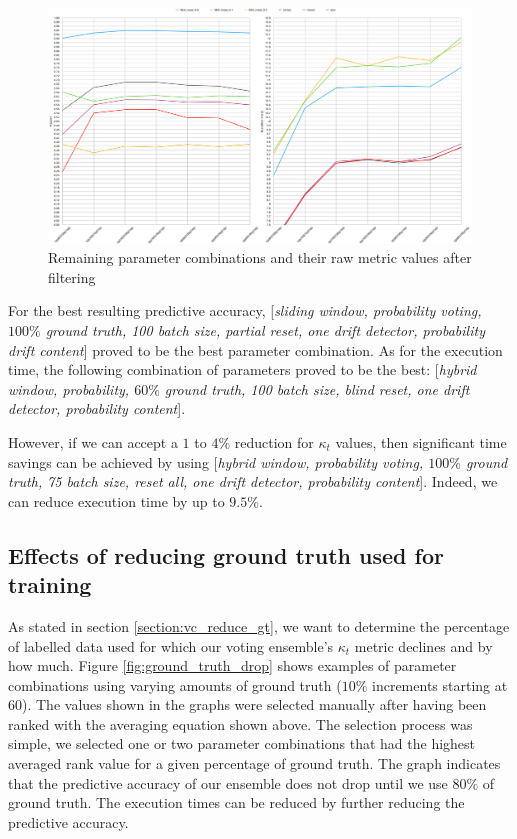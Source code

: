 \begin{figure}
  \includegraphics[width=\linewidth]{./images/chapter5/compare_both_best}
\caption{\label{fig:compare_both_best}Remaining parameter combinations and their raw metric values after filtering}
\end{figure}

For the best resulting predictive accuracy, [\textit{sliding window, probability voting, $100\%$ ground truth, 100 batch size, partial reset, one drift detector, probability drift content}] proved to be the best parameter combination. As for the execution time,  the following combination of parameters proved to be the best: [\textit{hybrid window, probability, $60\%$ ground truth, 100 batch size, blind reset, one drift detector, probability content}]. 

However, if we can accept a $1$ to $4\%$ reduction for $\kappa_t$ values, then significant time savings can be achieved by using [\textit{hybrid window, probability voting, $100\%$ ground truth, 75 batch size, reset all, one drift detector, probability content}]. Indeed, we can reduce execution time by up to $9.5\%$.

\subsection{Effects of reducing ground truth used for training}
As stated in section \ref{section:vc_reduce_gt}, we want to determine the percentage of labelled data used for which our voting ensemble's $\kappa_t$ metric declines and by how much. Figure \ref{fig:ground_truth_drop} shows examples of parameter combinations using varying amounts of ground truth ($10\%$ increments starting at 60). The values shown in the graphs were selected manually after having been ranked with the averaging equation shown above. The selection process was simple, we selected one or two parameter combinations that had the highest averaged rank value for a given percentage of ground truth. The graph indicates that the predictive accuracy of our ensemble does not drop until we use $80\%$ of ground truth. The execution times can be reduced by further reducing the predictive accuracy.

